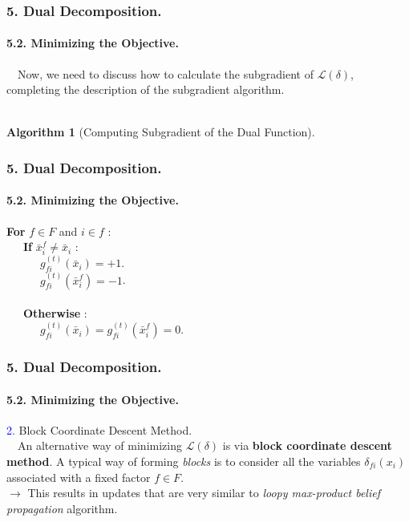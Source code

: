 \documentclass[11pt]{beamer}
\newtheorem*{pf of lemma}{\it Proof of the \normalfont \bf Lemma}
\newtheorem*{pf of claim}{\it Proof of the \normalfont \sf Claim}
\newtheorem{algorithm}{Algorithm}
\begin{document}
\begin{frame}
\frametitle{5. Dual Decomposition.}
\framesubtitle{5.2. Minimizing the Objective.}
\ \ \indent Now, we need to discuss how to calculate the subgradient of $\mathcal{L} \left( \delta \right)$, completing the description of the subgradient algorithm. \\ \ \\

\begin{algorithm} [Computing Subgradient of the Dual Function] 
\end{algorithm}

\end{frame}

\begin{frame}
\frametitle{5. Dual Decomposition.}
\framesubtitle{5.2. Minimizing the Objective.}

\textbf{For} $f \in F$ and $i \in f$ : \\
\ \ \ \indent \textbf{If} $\bar{x}_{i}^f \neq \bar{x}_i$ : \\
\ \ \ \ \ \ \indent $g_{fi}^{(t)} \left( \bar{x}_i \right) = +1$. \\
\ \ \ \ \ \ \indent $g_{fi}^{(t)} \left( \bar{x}_{i}^f \right) = -1$. \\ \ \\
\ \ \ \indent \textbf{Otherwise} : \\
\ \ \ \ \ \ \indent $g_{fi}^{(t)} \left( \bar{x}_i \right) = g_{fi}^{(t)} \left( \bar{x}_{i}^f \right) = 0$.
\end{frame}

\begin{frame}
\frametitle{5. Dual Decomposition.}
\framesubtitle{5.2. Minimizing the Objective.}

\textcolor{blue}{2.} Block Coordinate Descent Method. \\
\ \ \indent An alternative way of minimizing $\mathcal{L} \left( \delta \right)$ is via \textbf{block coordinate descent method}. A typical way of forming \textit{blocks} is to consider all the variables $\delta_{fi} \left( x_i \right)$ associated with a fixed factor $f \in F$. \\
$\rightarrow$ This results in updates that are very similar to \textit{loopy max-product belief propagation} algorithm.

\end{frame}
\end{document}
